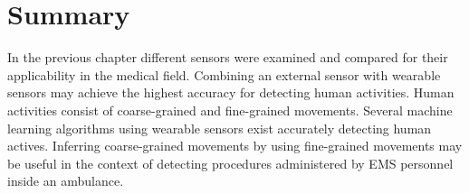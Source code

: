 \section{Summary}
\label{sec:Literature-Review:Summary}
In the previous chapter different sensors were examined and compared for their applicability in the medical field. Combining an external sensor with wearable sensors may achieve the highest accuracy for detecting human activities. Human activities consist of coarse-grained and fine-grained movements. Several machine learning algorithms using wearable sensors exist accurately detecting human actives. Inferring coarse-grained movements by using fine-grained movements may be useful in the context of detecting procedures administered by EMS personnel inside an ambulance. 
